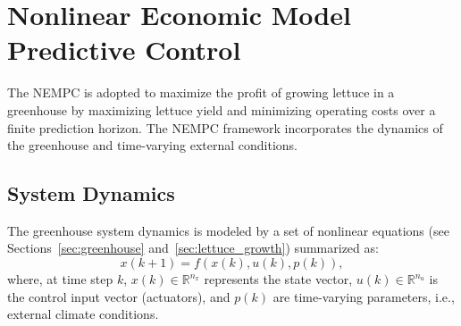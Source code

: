 \documentclass[conference]{IEEEtran}
\newcommand{\ui}[2]{#1_{\mathrm{#2}}}
\newcommand{\coo}{\ensuremath{\mathrm{CO_2}}}
\begin{document}







%
\section{Nonlinear Economic Model Predictive Control}\label{sec:mpc}
The NEMPC is adopted to maximize the profit of growing lettuce in a greenhouse by maximizing lettuce yield and minimizing operating costs over a finite prediction horizon. The NEMPC framework incorporates the dynamics of the greenhouse and time-varying external conditions.

\subsection{System Dynamics}\label{subsec:mpc_dynamics}
The greenhouse system dynamics is modeled by a set of nonlinear equations (see Sections~\ref{sec:greenhouse} and~\ref{sec:lettuce_growth}) summarized as:
\begin{equation}
    x(k+1) = f\left( x(k), u(k), p(k) \right),
\end{equation}
where, at time step \(k\), \(x(k) \in \mathbb{R}^{n_x}\) represents the state vector, \(u(k) \in \mathbb{R}^{n_u}\) is the control input vector (actuators), and \(p(k)\) are time-varying parameters, i.e., external climate conditions.
\end{document}
